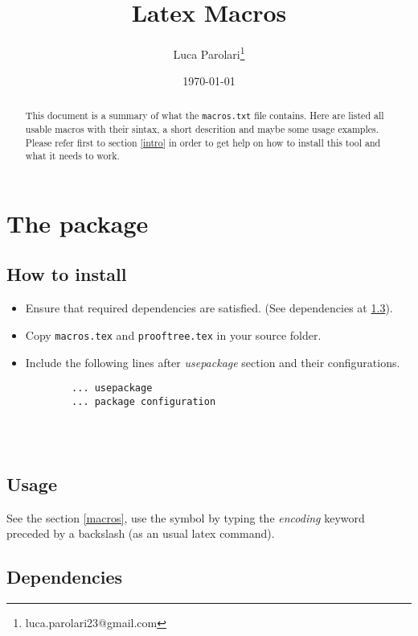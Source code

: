 \documentclass[11pt]{article}
\title{\textbf{Latex Macros}}
\author{Luca Parolari\footnote{luca.parolari23@gmail.com}}
\date{\today}
\begin{document}
\maketitle

\begin{abstract}
	This document is a summary of what the \texttt{macros.txt} file contains. Here are listed all usable macros with their sintax, a short descrition and maybe some usage examples. Please refer first to section \ref{intro} in order to get help on how to install this tool and what it needs to work.
\end{abstract}

\tableofcontents
\clearpage

\section{The package}
\label{intro}

\subsection{How to install}
\label{install}

\begin{itemize}
	\item Ensure that required dependencies are satisfied. (See dependencies at \ref{deps}).
	\item Copy \texttt{macros.tex} and \texttt{prooftree.tex} in your source folder.
	\item Include the following lines after \emph{usepackage} section and their configurations.
	\begin{verbatim}
		... usepackage
		... package configuration
		
		
		
	\end{verbatim}
\end{itemize}

\subsection{Usage}

See the section \ref{macros}, use the symbol by typing the \emph{encoding} keyword preceded by a backslash (as an usual latex command).

\subsection{Dependencies}
\label{deps}
\end{document}
